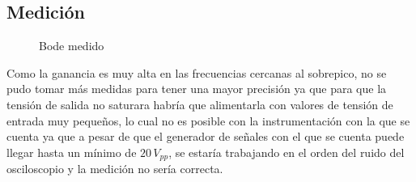 \subsection{Medición}
\begin{figure}[H]
	\begin{center}
		\caption{Bode medido}
		\label{fig:medicionderivador}
	\end{center}
\end{figure}


Como la ganancia es muy alta en las frecuencias cercanas al sobrepico, no se pudo tomar más medidas para tener una mayor precisión ya que para que la tensión de salida no saturara habría que alimentarla con valores de tensión de entrada muy pequeños, lo cual no es posible con la instrumentación con la que se cuenta ya que a pesar de que el generador de señales con el que se cuenta puede llegar hasta un mínimo de $20 \, V_{pp}$, se estaría trabajando en el orden del ruido del osciloscopio y la medición no sería correcta.


